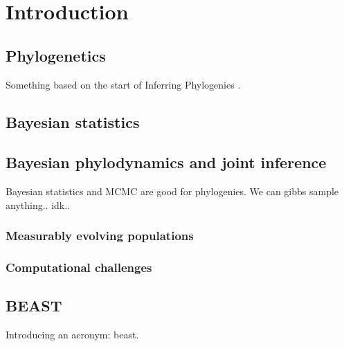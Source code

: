 \chapter{Introduction}\label{ch:introduction}



\section{Phylogenetics}

Something based on the start of Inferring Phylogenies \cite{felsenstein2003inferring}.

\section{Bayesian statistics}

\section{Bayesian phylodynamics and joint inference}

Bayesian statistics and MCMC are good for phylogenies.
We can gibbs sample anything.. idk..

\subsection{Measurably evolving populations}

\subsection{Computational challenges}

\section{BEAST}

Introducing an acronym: \gls{beast}.


\cleardoublepage

